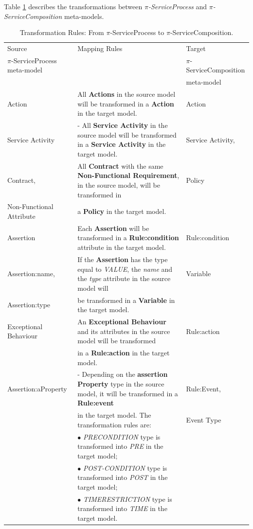 Table \ref{tab:transformationServiceProcessToComposition} describes the
transformations between \textit{$\pi$-ServiceProcess} and
\textit{$\pi$-ServiceComposition} meta-models.

\begin{table} [ht!]
\tiny
\renewcommand{\arraystretch}{1.3}
\caption{Transformation Rules: From $\pi$-ServiceProcess to
$\pi$-ServiceComposition.}
\label{tab:transformationServiceProcessToComposition}
\centering
\begin{tabular}{l|l|l}
    \hline
    Source  &  Mapping Rules & Target\\
    $\pi$-ServiceProcess meta-model &   & $\pi$-ServiceComposition\\
      &&  meta-model\\
    \hline
    \hline

   Action & All \textbf{Actions} in the source model will be
   transformed in a \textbf{Action} in the target model. &Action\\
   \hline
   Service Activity&  - All \textbf{Service Activity} in the source model will
   be transformed in a \textbf{Service Activity} in the target model. &Service Activity,\\
   \hline
   Contract, & All \textbf{Contract} with the same \textbf{Non-Functional
   Requirement}, in the source model, will be transformed in& Policy\\
   Non-Functional Attribute&  a \textbf{Policy} in the target
   model.&\\
   \hline
   Assertion & Each \textbf{Assertion} will be transformed in a
   \textbf{Rule:condition} attribute in the target model. & Rule:condition\\
   \hline

   Assertion:name, & If the \textbf{Assertion} has the type equal to
   \textit{VALUE}, the \textit{name} and the \textit{type} attribute in the source
   model will & Variable\\
   Assertion:type & be transformed in a \textbf{Variable} in the target model.&
   \\
   \hline
   Exceptional Behaviour & An \textbf{Exceptional Behaviour} and its attributes in
   the source model will be transformed & Rule:action\\
   &in a \textbf{Rule:action} in the target model. &\\
   \hline
   Assertion:aProperty &- Depending on the \textbf{assertion Property} type in
   the source model, it will be transformed in a \textbf{Rule:event}&
   Rule:Event,\\ & in the target model. The transformation rules
    are:& Event Type\\
    &$\bullet$ \textit{PRECONDITION} type is transformed into \textit{PRE}
    in the target model;&\\
    &$\bullet$ \textit{POST-CONDITION} type is transformed into \textit{POST} in
    the target model;&\\
    &$\bullet$ \textit{TIMERESTRICTION} type is transformed into \textit{TIME}
    in the target model.&\\
   \hline


\end{tabular}
\end{table}
